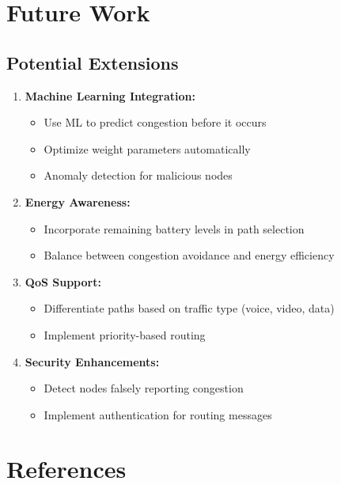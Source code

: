 \documentclass[12pt,a4paper]{article}
\begin{document}
\section{Future Work}

\subsection{Potential Extensions}

\begin{enumerate}
    \item \textbf{Machine Learning Integration:}
    \begin{itemize}
        \item Use ML to predict congestion before it occurs
        \item Optimize weight parameters automatically
        \item Anomaly detection for malicious nodes
    \end{itemize}
    
    \item \textbf{Energy Awareness:}
    \begin{itemize}
        \item Incorporate remaining battery levels in path selection
        \item Balance between congestion avoidance and energy efficiency
    \end{itemize}
    
    \item \textbf{QoS Support:}
    \begin{itemize}
        \item Differentiate paths based on traffic type (voice, video, data)
        \item Implement priority-based routing
    \end{itemize}
    
    \item \textbf{Security Enhancements:}
    \begin{itemize}
        \item Detect nodes falsely reporting congestion
        \item Implement authentication for routing messages
    \end{itemize}
    
  
\end{enumerate}


\section*{References}
\end{document}
